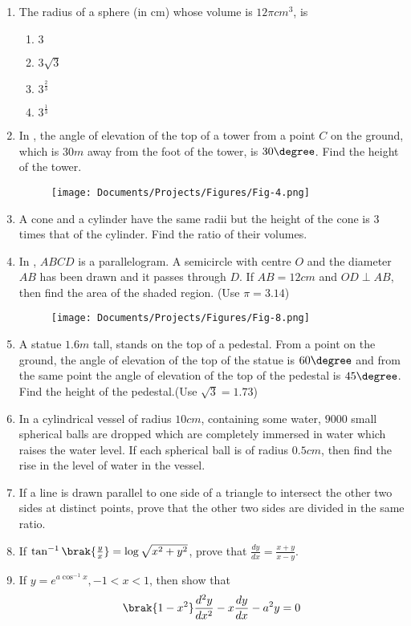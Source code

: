 \begin{enumerate}
\item The radius of a sphere (in cm) whose volume is $12\pi cm^3$, is
\begin{enumerate}
\item $3$
\item $3 \sqrt{3}$
\item $3^\frac{2}{3}$
\item $3^\frac{1}{3}$
\end{enumerate}
\item In , the angle of elevation of the top of a tower from a point $C$ on the ground, which is $30m$ away from the foot of the tower, is $30\degree$. Find the height of the tower.      
\begin{figure}[H]
\centering
\texttt{[image: Documents/Projects/Figures/Fig-4.png]}
\caption{}      
\label{fig:Fig-4.png}
\end{figure}
\item A cone and a cylinder have the same radii but the height of the cone is $3$ times that of the cylinder. Find the ratio of their volumes.
\item In , $ABCD$ is a parallelogram. A semicircle with centre $O$ and the diameter $AB$ has been drawn and it passes through $D$. If $AB=12cm$ and $OD \perp AB$, then find the area of the shaded region. (Use $\pi=3.14$)
\begin{figure}[H]
\centering
\texttt{[image: Documents/Projects/Figures/Fig-8.png]}
\caption{}
\label{fig:Fig-8.png}
\end{figure}
\item A statue $1.6m$ tall, stands on the top of a pedestal. From a point on the ground, the angle of elevation of the top of the statue is $60\degree$ and from the same point the angle of elevation of the top of the pedestal is $45\degree$. Find the height of the pedestal.(Use $\sqrt{3}=1.73$)
\item In a cylindrical vessel of radius $10 cm$, containing some water, $9000$ small spherical balls are dropped which are completely immersed in water which raises the water level. If each spherical ball is of radius $0.5 cm$, then find the rise in the level of water in the vessel.
\item If a line is drawn parallel to one side of a triangle to intersect the other two sides at distinct points, prove that the other two sides are divided in the same ratio.
\item If $\tan^{-1}\brak{\frac{y}{x}}=\log\sqrt{x^2+y^2}$, prove that $\frac{dy}{dx}=\frac{x+y}{x-y}$.
\item If $y=e^{a \cos^{-1}x}, -1<x<1$, then show that
\begin{align}	
	\brak{1-x^2}\frac{d^2y}{dx^2}-x\frac{dy}{dx}-a^2y=0
\end{align}
\end{enumerate}


